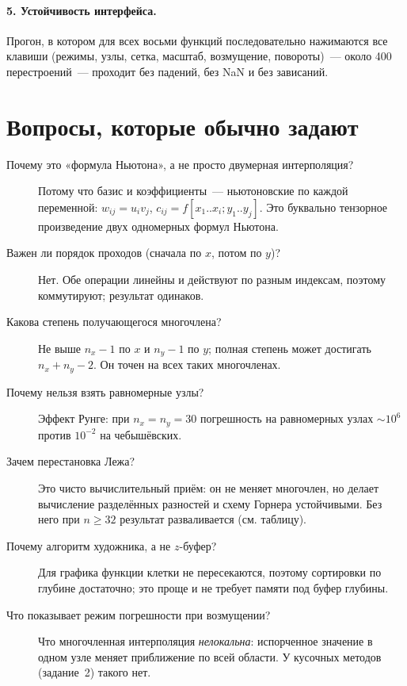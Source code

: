 \documentclass[11pt,a4paper]{report}
\begin{document}
\paragraph{5. Устойчивость интерфейса.} Прогон, в котором для всех восьми
функций последовательно нажимаются все клавиши (режимы, узлы, сетка, масштаб,
возмущение, повороты)~--- около 400 перестроений~--- проходит без падений, без
NaN и без зависаний.

\section{Вопросы, которые обычно задают}

\begin{description}
\item[Почему это «формула Ньютона», а не просто двумерная интерполяция?]
Потому что базис и коэффициенты~--- ньютоновские по каждой переменной:
$w_{ij}=u_iv_j$, $c_{ij}=f[x_1..x_i;y_1..y_j]$. Это буквально тензорное
произведение двух одномерных формул Ньютона.

\item[Важен ли порядок проходов (сначала по $x$, потом по $y$)?] Нет. Обе
операции линейны и действуют по разным индексам, поэтому коммутируют; результат
одинаков.

\item[Какова степень получающегося многочлена?] Не выше $n_x-1$ по $x$ и
$n_y-1$ по $y$; полная степень может достигать $n_x+n_y-2$. Он точен на всех
таких многочленах.

\item[Почему нельзя взять равномерные узлы?] Эффект Рунге: при
$n_x=n_y=30$ погрешность на равномерных узлах $\sim10^{6}$ против
$10^{-2}$ на чебышёвских.

\item[Зачем перестановка Лежа?] Это чисто вычислительный приём: он не меняет
многочлен, но делает вычисление разделённых разностей и схему Горнера
устойчивыми. Без него при $n\ge32$ результат разваливается (см. таблицу).

\item[Почему алгоритм художника, а не $z$-буфер?] Для графика функции клетки
не пересекаются, поэтому сортировки по глубине достаточно; это проще и не
требует памяти под буфер глубины.

\item[Что показывает режим погрешности при возмущении?] Что многочленная
интерполяция \emph{нелокальна}: испорченное значение в одном узле меняет
приближение по всей области. У кусочных методов (задание~2) такого нет.
\end{description}
\end{document}
